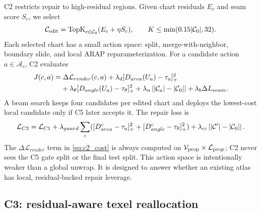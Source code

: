 C2 restricts repair to high-residual regions. Given chart residuals \(E_c\) and seam score \(S_c\), we select
\begin{equation}
\mathcal{C}_{\mathrm{edit}}=\operatorname{TopK}_{c\in \mathcal{C}_0}(E_c+\eta S_c),
\qquad
K\le \min(0.15|\mathcal{C}_0|,32).
\label{eq:topk}
\end{equation}
Each selected chart has a small action space: split, merge-with-neighbor, boundary slide, and local ARAP reparameterization. For a candidate action \(a\in\mathcal{A}_c\), C2 evaluates
\begin{align}
J(c,a)=&\;\Delta\mathcal{L}_{render}(c,a)
+\lambda_d[D_{area}(U_a)-\tau_a]_+^2 \nonumber\\
&+\lambda_\theta[D_{angle}(U_a)-\tau_\theta]_+^2
+\lambda_n\left||\mathcal{C}_a|-|\mathcal{C}_0|\right|
+\lambda_b\Delta L_{seam}.
\label{eq:c2_cost}
\end{align}
A beam search keeps four candidates per edited chart and deploys the lowest-cost local candidate only if C5 later accepts it. The repair loss is
\begin{equation}
\mathcal{L}_{C2}=\mathcal{L}_{C1}
+\lambda_{guard}\sum_c([D_{area}^c-\tau_a]_+^2+[D_{angle}^c-\tau_\theta]_+^2)
+\lambda_{cc}\left||\mathcal{C}'|-|\mathcal{C}_0|\right|.
\label{eq:c2_loss}
\end{equation}
The \(\Delta\mathcal{L}_{render}\) term in \cref{eq:c2_cost} is always computed on \(\mathcal{V}_{\mathrm{prop}}\times\mathcal{L}_{\mathrm{prop}}\); C2 never sees the C5 gate split or the final test split. This action space is intentionally weaker than a global unwrap. It is designed to answer whether an existing atlas has local, residual-backed repair leverage.

\subsection{C3: residual-aware texel reallocation}
\label{sec:c3}

